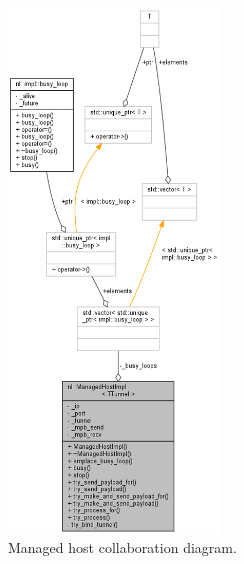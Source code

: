 \documentclass[11pt]{report}
\newcommand{\+}{\discretionary{\mbox{\scriptsize$\hookleftarrow$}}{}{}}
\begin{document}
                \begin{figure}[H]
                \caption{Managed host collaboration diagram.}
                \centering
                \includegraphics[width=0.5\textwidth]{d/coll/coll_manhost.png}
                \end{figure}

                \newpage
\end{document}
